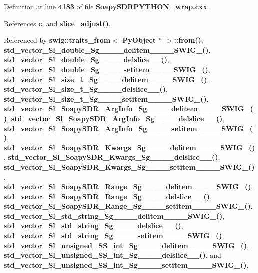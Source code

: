 Definition at line {\bf 4183} of file {\bf Soapy\+S\+D\+R\+P\+Y\+T\+H\+O\+N\+\_\+wrap.\+cxx}.



References {\bf c}, and {\bf slice\+\_\+adjust()}.



Referenced by {\bf swig\+::traits\+\_\+from$<$ Py\+Object $\ast$ $>$\+::from()}, {\bf std\+\_\+vector\+\_\+\+Sl\+\_\+double\+\_\+\+Sg\+\_\+\+\_\+\+\_\+\+\_\+delitem\+\_\+\+\_\+\+\_\+\+\_\+\+S\+W\+I\+G\+\_()}, {\bf std\+\_\+vector\+\_\+\+Sl\+\_\+double\+\_\+\+Sg\+\_\+\+\_\+\+\_\+\+\_\+delslice\+\_\+\+\_\+()}, {\bf std\+\_\+vector\+\_\+\+Sl\+\_\+double\+\_\+\+Sg\+\_\+\+\_\+\+\_\+\+\_\+setitem\+\_\+\+\_\+\+\_\+\+\_\+\+S\+W\+I\+G\+\_()}, {\bf std\+\_\+vector\+\_\+\+Sl\+\_\+size\+\_\+t\+\_\+\+Sg\+\_\+\+\_\+\+\_\+\+\_\+delitem\+\_\+\+\_\+\+\_\+\+\_\+\+S\+W\+I\+G\+\_()}, {\bf std\+\_\+vector\+\_\+\+Sl\+\_\+size\+\_\+t\+\_\+\+Sg\+\_\+\+\_\+\+\_\+\+\_\+delslice\+\_\+\+\_\+()}, {\bf std\+\_\+vector\+\_\+\+Sl\+\_\+size\+\_\+t\+\_\+\+Sg\+\_\+\+\_\+\+\_\+\+\_\+setitem\+\_\+\+\_\+\+\_\+\+\_\+\+S\+W\+I\+G\+\_()}, {\bf std\+\_\+vector\+\_\+\+Sl\+\_\+\+Soapy\+S\+D\+R\+\_\+\+Arg\+Info\+\_\+\+Sg\+\_\+\+\_\+\+\_\+\+\_\+delitem\+\_\+\+\_\+\+\_\+\+\_\+\+S\+W\+I\+G\+\_()}, {\bf std\+\_\+vector\+\_\+\+Sl\+\_\+\+Soapy\+S\+D\+R\+\_\+\+Arg\+Info\+\_\+\+Sg\+\_\+\+\_\+\+\_\+\+\_\+delslice\+\_\+\+\_\+()}, {\bf std\+\_\+vector\+\_\+\+Sl\+\_\+\+Soapy\+S\+D\+R\+\_\+\+Arg\+Info\+\_\+\+Sg\+\_\+\+\_\+\+\_\+\+\_\+setitem\+\_\+\+\_\+\+\_\+\+\_\+\+S\+W\+I\+G\+\_()}, {\bf std\+\_\+vector\+\_\+\+Sl\+\_\+\+Soapy\+S\+D\+R\+\_\+\+Kwargs\+\_\+\+Sg\+\_\+\+\_\+\+\_\+\+\_\+delitem\+\_\+\+\_\+\+\_\+\+\_\+\+S\+W\+I\+G\+\_()}, {\bf std\+\_\+vector\+\_\+\+Sl\+\_\+\+Soapy\+S\+D\+R\+\_\+\+Kwargs\+\_\+\+Sg\+\_\+\+\_\+\+\_\+\+\_\+delslice\+\_\+\+\_\+()}, {\bf std\+\_\+vector\+\_\+\+Sl\+\_\+\+Soapy\+S\+D\+R\+\_\+\+Kwargs\+\_\+\+Sg\+\_\+\+\_\+\+\_\+\+\_\+setitem\+\_\+\+\_\+\+\_\+\+\_\+\+S\+W\+I\+G\+\_()}, {\bf std\+\_\+vector\+\_\+\+Sl\+\_\+\+Soapy\+S\+D\+R\+\_\+\+Range\+\_\+\+Sg\+\_\+\+\_\+\+\_\+\+\_\+delitem\+\_\+\+\_\+\+\_\+\+\_\+\+S\+W\+I\+G\+\_()}, {\bf std\+\_\+vector\+\_\+\+Sl\+\_\+\+Soapy\+S\+D\+R\+\_\+\+Range\+\_\+\+Sg\+\_\+\+\_\+\+\_\+\+\_\+delslice\+\_\+\+\_\+()}, {\bf std\+\_\+vector\+\_\+\+Sl\+\_\+\+Soapy\+S\+D\+R\+\_\+\+Range\+\_\+\+Sg\+\_\+\+\_\+\+\_\+\+\_\+setitem\+\_\+\+\_\+\+\_\+\+\_\+\+S\+W\+I\+G\+\_()}, {\bf std\+\_\+vector\+\_\+\+Sl\+\_\+std\+\_\+string\+\_\+\+Sg\+\_\+\+\_\+\+\_\+\+\_\+delitem\+\_\+\+\_\+\+\_\+\+\_\+\+S\+W\+I\+G\+\_()}, {\bf std\+\_\+vector\+\_\+\+Sl\+\_\+std\+\_\+string\+\_\+\+Sg\+\_\+\+\_\+\+\_\+\+\_\+delslice\+\_\+\+\_\+()}, {\bf std\+\_\+vector\+\_\+\+Sl\+\_\+std\+\_\+string\+\_\+\+Sg\+\_\+\+\_\+\+\_\+\+\_\+setitem\+\_\+\+\_\+\+\_\+\+\_\+\+S\+W\+I\+G\+\_()}, {\bf std\+\_\+vector\+\_\+\+Sl\+\_\+unsigned\+\_\+\+S\+S\+\_\+int\+\_\+\+Sg\+\_\+\+\_\+\+\_\+\+\_\+delitem\+\_\+\+\_\+\+\_\+\+\_\+\+S\+W\+I\+G\+\_()}, {\bf std\+\_\+vector\+\_\+\+Sl\+\_\+unsigned\+\_\+\+S\+S\+\_\+int\+\_\+\+Sg\+\_\+\+\_\+\+\_\+\+\_\+delslice\+\_\+\+\_\+()}, and {\bf std\+\_\+vector\+\_\+\+Sl\+\_\+unsigned\+\_\+\+S\+S\+\_\+int\+\_\+\+Sg\+\_\+\+\_\+\+\_\+\+\_\+setitem\+\_\+\+\_\+\+\_\+\+\_\+\+S\+W\+I\+G\+\_()}.



